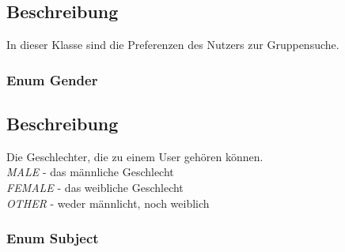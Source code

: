 \documentclass[a4paper]{scrreprt}
\begin{document}
\subsection*{Beschreibung}
In dieser Klasse sind die Preferenzen des Nutzers zur Gruppensuche.

\subsubsection{Enum Gender}
\subsection*{Beschreibung}
Die Geschlechter, die zu einem User gehören können. \\
\textit{MALE} - das männliche Geschlecht \\
\textit{FEMALE} - das weibliche Geschlecht \\
\textit{OTHER} - weder männlicht, noch weiblich \\

\subsubsection{Enum Subject}
\end{document}
